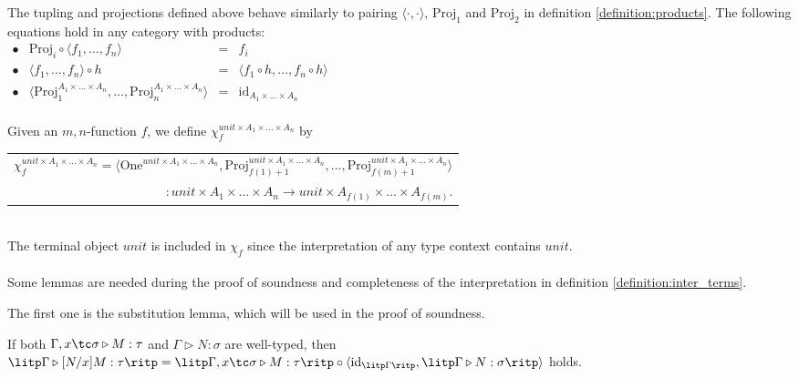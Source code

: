 The tupling and projections defined above behave similarly to pairing $ \langle \cdot , \cdot \rangle $, $ \text{Proj}_1 $ and $ \text{Proj}_2 $ in definition \ref{definition:products}. The following equations hold in any category with products:\\[5pt]
$
\begin{array}{rlcl}
\bullet & \text{Proj}_i \circ \langle f_1, \ldots , f_n \rangle & = & f_i \\[5pt]
\bullet & \langle f_1, \ldots , f_n \rangle \circ h & = & \langle f_1 \circ h, \ldots , f_n \circ h \rangle \\[5pt]
\bullet & \langle \text{Proj}_1^{A_1 \times \ldots \times A_n}, \ldots , \text{Proj}_n^{A_1 \times \ldots \times A_n} \rangle & = & \text{id}_{A_1 \times \ldots \times A_n} \\[10pt]
\end{array}
$

Given an $m,n$-function $ f $, we define $ \chi_f^{unit \times A_1 \times \ldots \times A_n} $ by \\[3pt]
\begin{tabular}{m{}}
$
\chi_f^{unit \times A_1 \times \ldots \times A_n} = \langle \text{One}^{unit \times A_1 \times \ldots \times A_n}, \text{Proj}_{f(1)+1}^{unit \times A_1 \times \ldots \times A_n}, \ldots , \text{Proj}_{f(m)+1}^{unit \times A_1 \times \ldots \times A_n} \rangle
$ \\[3pt]
\multicolumn{1}{r}{$ : unit \times A_1 \times \ldots \times A_n \to unit \times A_{f(1)} \times \ldots \times A_{f(m)} $.}
\end{tabular} \\[3pt]
The terminal object $ unit $ is included in $ \chi_f $ since the interpretation of any type context contains $ unit $.
\\
\\
Some lemmas are needed during the proof of soundness and completeness of the interpretation in definition \ref{definition:inter_terms}.

The first one is the substitution lemma, which will be used in the proof of soundness.

\begin{lemma}
\label{lemma:subs}
If both $ \Gamma , x \tc \sigma \triangleright M: \tau $ and $ \Gamma \triangleright N: \sigma $ are well-typed, then $ \litp \Gamma \triangleright [N/x]M: \tau \ritp = \litp \Gamma , x \tc \sigma \triangleright M: \tau \ritp \circ \langle \textnormal{id}_{\litp \Gamma \ritp} , \litp \Gamma \triangleright N: \sigma \ritp \rangle $ holds.
\end{lemma}

